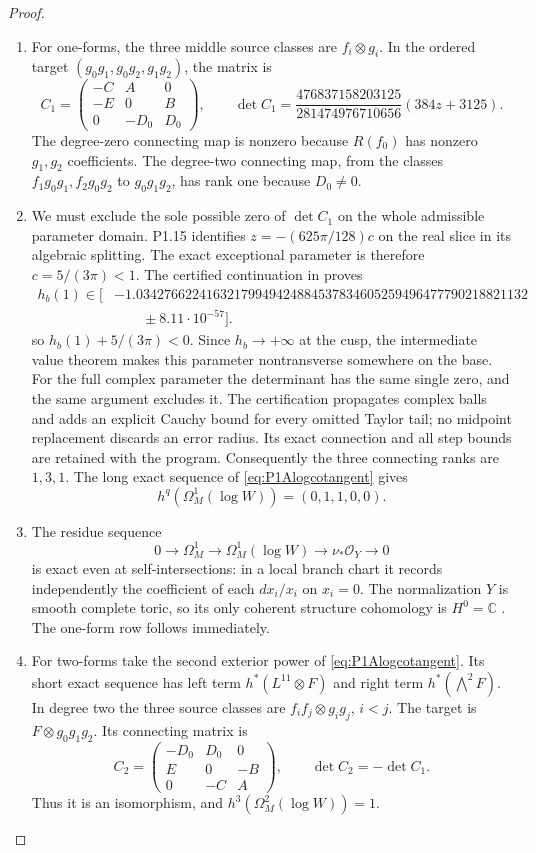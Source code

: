 \begin{proof}
\begin{enumerate}[label=\arabic*.]
\item For one-forms, the three middle source classes are $f_i\otimes g_i$.
In the ordered target $(g_0g_1,g_0g_2,g_1g_2)$, the matrix is
\[
C_1=\begin{pmatrix}-C&A&0\\-E&0&B\\0&-D_0&D_0\end{pmatrix},
\qquad
\det C_1=
\frac{476837158203125}{281474976710656}(384z+3125).
\]
The degree-zero connecting map is nonzero because $R(f_0)$
has nonzero $g_1,g_2$ coefficients. The degree-two connecting
map, from the classes $f_1g_0g_1,f_2g_0g_2$ to $g_0g_1g_2$,
has rank one because $D_0\ne0$.

\item We must exclude the sole possible zero of $\det C_1$ on the
whole admissible parameter domain. P1.15 identifies
$z=-(625\pi/128)c$ on the real slice in its algebraic splitting.
The exact exceptional parameter is therefore $c=5/(3\pi)<1$.
The certified continuation in
 proves
\[
\begin{aligned}
h_b(1)\in\bigl[&
-1.03427662241632179949424884537834605259496477790218821132\\
&\qquad\mathbin{\pm}8.11\cdot10^{-57}\bigr].
\end{aligned}
\]
so $h_b(1)+5/(3\pi)<0$. Since $h_b\to+\infty$ at the cusp,
the intermediate value theorem makes this parameter
nontransverse somewhere on the base. For the full complex
parameter the determinant has the same single zero, and the
same argument excludes it. The certification propagates complex
balls and adds an explicit Cauchy bound for every omitted
Taylor tail; no midpoint replacement discards an error radius.
Its exact connection and all step bounds are retained with the
program. Consequently the three connecting ranks are $1,3,1$.
The long exact sequence of \eqref{eq:P1Alogcotangent} gives
\[
h^q(\Omega_M^1(\log W))=(0,1,1,0,0).
\]

\item The residue sequence
\[
0\to\Omega_M^1\to\Omega_M^1(\log W)\to\nu_*\mathcal O_Y\to0
\]
is exact even at self-intersections: in a local branch chart it
records independently the coefficient of each $dx_i/x_i$ on
$x_i=0$. The normalization $Y$ is smooth complete toric, so its
only coherent structure cohomology is $H^0=\mathbb C$ \cite[Theorem 9.2.3, p.~410]{CoxLittleSchenck2011}.
The one-form row follows immediately.

\item For two-forms take the second exterior power of
\eqref{eq:P1Alogcotangent}. Its short exact sequence has left
term $h^*(L^{11}\otimes F)$ and right term
$h^*(\bigwedge^2F)$. In degree two the three source classes
are $f_if_j\otimes g_ig_j$, $i<j$. The target is
$F\otimes g_0g_1g_2$. Its connecting matrix is
\[
C_2=\begin{pmatrix}-D_0&D_0&0\\E&0&-B\\0&-C&A\end{pmatrix},
\qquad \det C_2=-\det C_1.
\]
Thus it is an isomorphism, and
$h^3(\Omega_M^2(\log W))=1$.


\end{enumerate}
\end{proof}
